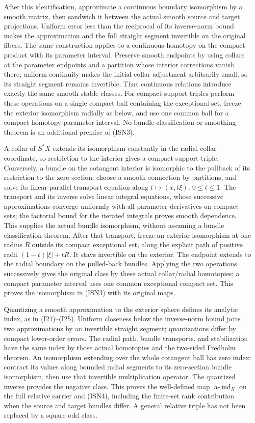 \documentclass[
  11pt,
]{article}
\begin{document}
After this identification, approximate a continuous boundary isomorphism
by a smooth matrix, then sandwich it between the actual smooth source
and target projections. Uniform error less than the reciprocal of its
inverse-norm bound makes the approximation and the full straight segment
invertible on the original fibers. The same construction applies to a
continuous homotopy on the compact product with its parameter interval.
Preserve smooth endpoints by using collars at the parameter endpoints
and a partition whose interior corrections vanish there; uniform
continuity makes the initial collar adjustment arbitrarily small, so its
straight segment remains invertible. Thus continuous relations introduce
exactly the same smooth stable classes. For compact-support triples
perform these operations on a single compact ball containing the
exceptional set, freeze the exterior isomorphism radially as below, and
use one common ball for a compact homotopy parameter interval. No
bundle-classification or smoothing theorem is an additional premise of
(ISN3).

A collar of \(S^*X\) extends its isomorphism constantly in the radial
collar coordinate, so restriction to the interior gives a
compact-support triple. Conversely, a bundle on the cotangent interior
is isomorphic to the pullback of its restriction to the zero section:
choose a smooth connection by partitions, and solve its linear
parallel-transport equation along \(t\mapsto(x,t\xi)\),
\(0\leq t\leq1\). The transport and its inverse solve linear integral
equations, whose successive approximations converge uniformly with all
parameter derivatives on compact sets; the factorial bound for the
iterated integrals proves smooth dependence. This supplies the actual
bundle isomorphism, without assuming a bundle classification theorem.
After that transport, freeze an exterior isomorphism at one radius \(R\)
outside its compact exceptional set, along the explicit path of positive
radii \((1-t)|\xi|+tR\). It stays invertible on the exterior. The
endpoint extends to the radial boundary on the pulled-back bundles.
Applying the two operations successively gives the original class by
these actual collar/radial homotopies; a compact parameter interval uses
one common exceptional compact set. This proves the isomorphism in
(ISN3) with its original maps.

Quantizing a smooth approximation to the exterior sphere defines its
analytic index, as in (I21)--(I25). Uniform closeness below the
inverse-norm bound joins two approximations by an invertible straight
segment; quantizations differ by compact lower-order errors. The radial
path, bundle transports, and stabilization have the same index by those
actual homotopies and the two-sided Fredholm theorem. An isomorphism
extending over the whole cotangent ball has zero index: contract its
values along bounded radial segments to its zero-section bundle
isomorphism, then use that invertible multiplication operator. The
quantized inverse provides the negative class. This proves the
well-defined map \(\operatorname{a\!-\!ind}_X\) on the full relative
carrier and (ISN4), including the finite-set rank contribution when the
source and target bundles differ. A general relative triple has not been
replaced by a square odd class.
\end{document}
